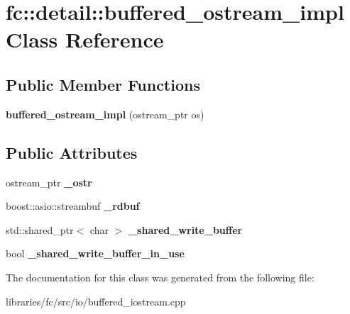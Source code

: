 \hypertarget{classfc_1_1detail_1_1buffered__ostream__impl}{}\section{fc\+:\+:detail\+:\+:buffered\+\_\+ostream\+\_\+impl Class Reference}
\label{classfc_1_1detail_1_1buffered__ostream__impl}
\subsection*{Public Member Functions}
\begin{DoxyCompactItemize}
\item 
\mbox{\label{classfc_1_1detail_1_1buffered__ostream__impl_afb5a9c7366e4724c2f7a5d42bdb4bc37}} 
{\bfseries buffered\+\_\+ostream\+\_\+impl} (ostream\+\_\+ptr os)
\end{DoxyCompactItemize}
\subsection*{Public Attributes}
\begin{DoxyCompactItemize}
\item 
\mbox{\label{classfc_1_1detail_1_1buffered__ostream__impl_a478a7f64f25359f4b6b4685b0891d1df}} 
ostream\+\_\+ptr {\bfseries \+\_\+ostr}
\item 
\mbox{\label{classfc_1_1detail_1_1buffered__ostream__impl_a861ea76552f1bf8771f13cae5a7cb140}} 
boost\+::asio\+::streambuf {\bfseries \+\_\+rdbuf}
\item 
\mbox{\label{classfc_1_1detail_1_1buffered__ostream__impl_acb5cfd74cbd745724b88ee93b5d7f0c6}} 
std\+::shared\+\_\+ptr$<$ char $>$ {\bfseries \+\_\+shared\+\_\+write\+\_\+buffer}
\item 
\mbox{\label{classfc_1_1detail_1_1buffered__ostream__impl_aeb1d23dc08f41b686dab2b3e0259c4ad}} 
bool {\bfseries \+\_\+shared\+\_\+write\+\_\+buffer\+\_\+in\+\_\+use}
\end{DoxyCompactItemize}


The documentation for this class was generated from the following file\+:\begin{DoxyCompactItemize}
\item 
libraries/fc/src/io/buffered\+\_\+iostream.\+cpp\end{DoxyCompactItemize}
